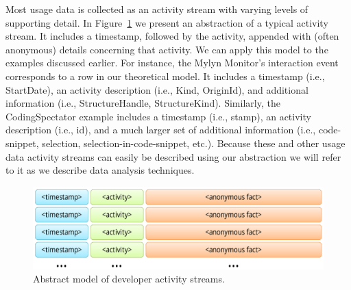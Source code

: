 Most usage data is collected as an activity stream with varying levels of supporting detail. In Figure~\ref{fig:theoretical} we present an abstraction of a typical activity stream. It includes a timestamp, followed by the activity, appended with (often anonymous) details concerning that activity. We can apply this model to the examples discussed earlier. For instance, the Mylyn Monitor's interaction event corresponds to a row in our theoretical model. It includes a timestamp (i.e., StartDate), an activity description (i.e., Kind, OriginId), and additional information (i.e., StructureHandle, StructureKind). Similarly, the CodingSpectator example includes a timestamp (i.e., stamp), an activity description (i.e., id), and a much larger set of additional information (i.e., code-snippet, selection, selection-in-code-snippet, etc.). Because these and other usage data activity streams can easily be described using our abstraction we will refer to it as we describe data analysis techniques.









\begin{figure}[t]
 \centering
\includegraphics[width=1\columnwidth]{../Graphics/activityLogTheoretical.pdf}
\caption{Abstract model of developer activity streams.}
\label{fig:theoretical}
\end{figure}



